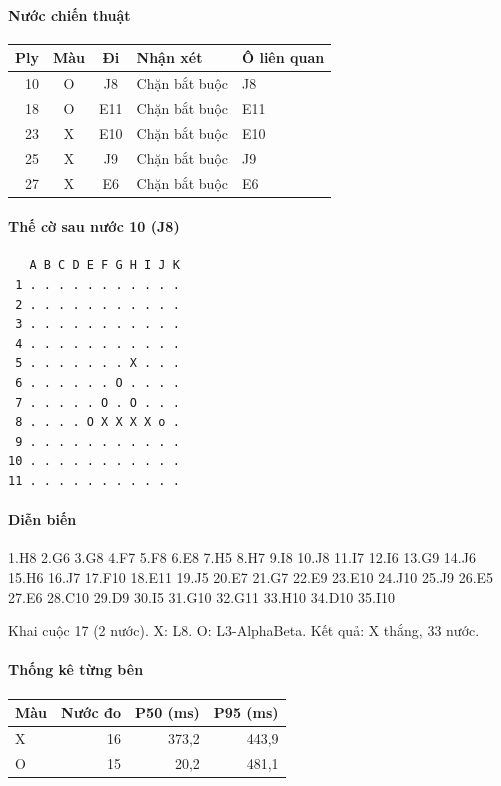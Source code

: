 \paragraph{Nước chiến thuật}
\begin{center}\small
\begin{tabular}{@{}rccll@{}}
\toprule
Ply & Màu & Đi & Nhận xét & Ô liên quan \\
\midrule
10 & O & J8 & Chặn bắt buộc & J8 \\
18 & O & E11 & Chặn bắt buộc & E11 \\
23 & X & E10 & Chặn bắt buộc & E10 \\
25 & X & J9 & Chặn bắt buộc & J9 \\
27 & X & E6 & Chặn bắt buộc & E6 \\
\bottomrule
\end{tabular}
\end{center}
\paragraph{Thế cờ sau nước 10 (J8)}
\begin{verbatim}
   A B C D E F G H I J K
 1 . . . . . . . . . . .
 2 . . . . . . . . . . .
 3 . . . . . . . . . . .
 4 . . . . . . . . . . .
 5 . . . . . . . X . . .
 6 . . . . . . O . . . .
 7 . . . . . O . O . . .
 8 . . . . O X X X X o .
 9 . . . . . . . . . . .
10 . . . . . . . . . . .
11 . . . . . . . . . . .
\end{verbatim}
\paragraph{Diễn biến}
{\footnotesize 1.H8 2.G6 3.G8 4.F7 5.F8 6.E8 7.H5 8.H7 9.I8 10.J8 11.I7 12.I6 13.G9 14.J6 15.H6 16.J7 17.F10 18.E11 19.J5 20.E7 21.G7 22.E9 23.E10 24.J10 25.J9 26.E5 27.E6 28.C10 29.D9 30.I5 31.G10 32.G11 33.H10 34.D10 35.I10\par}
Khai cuộc 17 (2 nước). X: L8. O: L3-AlphaBeta. Kết quả: X thắng, 33 nước.
\paragraph{Thống kê từng bên}
\begin{center}\small
\begin{tabular}{@{}lrrr@{}}
\toprule
Màu & Nước đo & P50 (ms) & P95 (ms) \\
\midrule
X & 16 & 373,2 & 443,9 \\
O & 15 & 20,2 & 481,1 \\
\bottomrule
\end{tabular}
\end{center}
